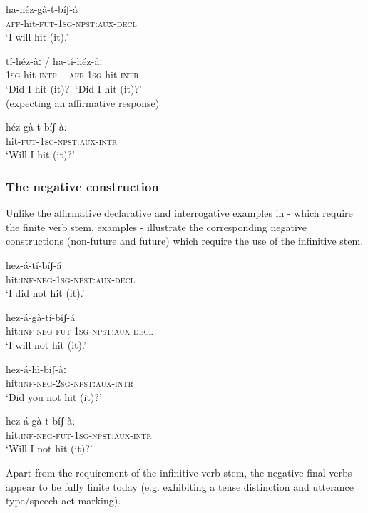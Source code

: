 \documentclass[output=paper]{langsci/langscibook}
\begin{document}
\ea\label{ex:mahland:53}
\gll ha-héz-gà-t-bíʃ-á\\
\textsc{aff}{}-hit-\textsc{fut-1sg-npst:aux-decl} \\
\glt `I will hit (it).'
\z

\ea\label{ex:mahland:54}
\gll tí-héz-àː       /    ha-tí-héz-âː\\
\textsc{1sg}{}-hit-\textsc{intr}   ~  \textsc{aff-1sg}{}-hit-\textsc{intr}\\
\glt `Did I hit (it)?'      `Did I hit (it)?' \\
(expecting an affirmative response)
\z

\ea\label{ex:mahland:55}
\gll héz-gà-t-bíʃ-àː\\
hit-\textsc{fut-1sg-npst:aux-intr}\\
\glt `Will I hit (it)?'
\z

\subsubsection{The negative construction}\label{sec:mahland:3.1.1}

Unlike the affirmative declarative and interrogative examples in - which require the finite verb stem, examples - illustrate the corresponding negative constructions (non-future and future) which require the use of the infinitive stem.

\ea\label{ex:mahland:56}
\gll hez-á-tí-bíʃ-á\\
hit:\textsc{inf-neg-1sg-npst:aux-decl} \\
\glt `I did not hit (it).'
\z

\ea\label{ex:mahland:57}
\gll hez-á-gà-tí-bíʃ-á\\
hit:\textsc{inf-neg-fut-1sg-npst:aux-decl} \\
\glt `I will not hit (it).'
\z

\ea\label{ex:mahland:58}
\gll hez-á-hì-biʃ-àː\\
hit:\textsc{inf-neg-2sg-npst:aux-intr}\\
\glt `Did you not hit (it)?'
\z

\ea\label{ex:mahland:59}
\gll hez-á-gà-t-bíʃ-àː\\
hit:\textsc{inf-neg-fut-1sg-npst:aux-intr}\\
\glt `Will I not hit (it)?'
\z

Apart from the requirement of the infinitive verb stem, the negative final verbs appear to be fully finite today (e.g. exhibiting a tense distinction and utterance type/speech act marking). 
\end{document}
